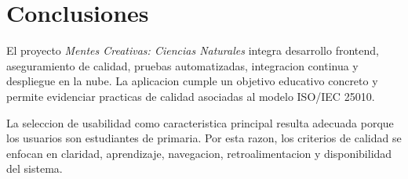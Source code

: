 \documentclass[man,12pt]{apa7}
\begin{document}
\section{Conclusiones}

El proyecto \textit{Mentes Creativas: Ciencias Naturales} integra desarrollo frontend, aseguramiento de calidad, pruebas automatizadas, integracion continua y despliegue en la nube. La aplicacion cumple un objetivo educativo concreto y permite evidenciar practicas de calidad asociadas al modelo ISO/IEC 25010.

La seleccion de usabilidad como caracteristica principal resulta adecuada porque los usuarios son estudiantes de primaria. Por esta razon, los criterios de calidad se enfocan en claridad, aprendizaje, navegacion, retroalimentacion y disponibilidad del sistema.

\printbibliography
\end{document}
